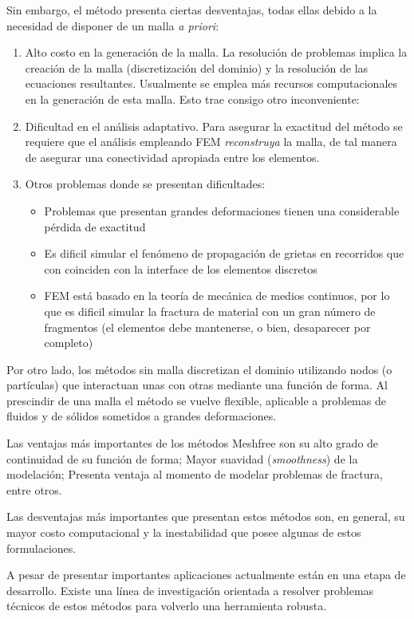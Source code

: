 Sin embargo, el método presenta ciertas desventajas, todas ellas debido a la necesidad de disponer de un malla \textit{a priori}:
\begin{enumerate}
\item Alto costo en la generación de la malla. La resolución de problemas implica la creación de la malla (discretización del dominio) y la resolución de las ecuaciones resultantes. Usualmente se emplea más recursos computacionales en la generación de esta malla. Esto trae consigo otro inconveniente:
\item Dificultad en el análisis adaptativo. Para asegurar la exactitud del método se requiere que el análisis empleando FEM \textit{reconstruya} la malla, de tal manera de asegurar una conectividad apropiada entre los elementos.
\item Otros problemas donde se presentan dificultades:
\begin{itemize}
\item Problemas que presentan grandes deformaciones tienen una considerable pérdida de exactitud
\item Es dificil simular el fenómeno de propagación de grietas en recorridos que con coinciden con la interface de los elementos discretos
\item FEM está basado en la teoría de mecánica de medios continuos, por lo que es dificil simular la fractura de material con un gran número de fragmentos (el elementos debe mantenerse, o bien, desaparecer por completo)
\end{itemize}
\end{enumerate}

Por otro lado, los métodos sin malla discretizan el dominio utilizando nodos (o partículas) que interactuan unas con otras mediante una función de forma. Al prescindir de una malla el método se vuelve flexible, aplicable a problemas de fluidos y de sólidos sometidos a grandes deformaciones.

Las ventajas más importantes de los métodos Meshfree son su alto grado de continuidad de su función de forma; Mayor suavidad (\textit{smoothness}) de la modelación; Presenta ventaja al momento de modelar problemas de fractura, entre otros.

Las desventajas más importantes que presentan estos métodos son, en general, su mayor costo computacional y la inestabilidad que posee algunas de estos formulaciones.

A pesar de presentar importantes aplicaciones actualmente están en una etapa de desarrollo. Existe una línea de investigación orientada a resolver problemas técnicos de estos métodos para volverlo una herramienta robusta.


